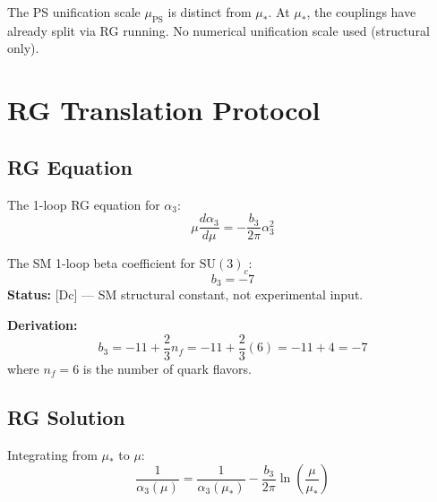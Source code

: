\documentclass[11pt,a4paper]{article}
\theoremstyle{definition}
\begin{document}
\begin{trapbox}
The PS unification scale $\mu_{\text{PS}}$ is distinct from $\mu_*$.
At $\mu_*$, the couplings have already split via RG running.
No numerical unification scale used (structural only).
\end{trapbox}

\newpage

\section{RG Translation Protocol}
\label{sec:rg-translation}

\subsection{RG Equation}
\label{subsec:rg-equation}

The 1-loop RG equation for $\alpha_3$:
\begin{equation}
  \label{eq:rg-alpha3}
  \mu \frac{d\alpha_3}{d\mu} = -\frac{b_3}{2\pi} \alpha_3^2
\end{equation}

\begin{canonbox}
The SM 1-loop beta coefficient for $\text{SU}(3)_c$:
\begin{equation}
  \label{eq:b3-value}
  b_3 = -7
\end{equation}
\textbf{Status:} [Dc] — SM structural constant, not experimental input.

\textbf{Derivation:}
\begin{equation}
  \label{eq:b3-derivation}
  b_3 = -11 + \frac{2}{3}n_f = -11 + \frac{2}{3}(6) = -11 + 4 = -7
\end{equation}
where $n_f = 6$ is the number of quark flavors.
\end{canonbox}

\subsection{RG Solution}
\label{subsec:rg-solution}

Integrating from $\mu_*$ to $\mu$:
\begin{equation}
  \label{eq:rg-solution}
  \frac{1}{\alpha_3(\mu)} = \frac{1}{\alpha_3(\mu_*)} - \frac{b_3}{2\pi} \ln\left(\frac{\mu}{\mu_*}\right)
\end{equation}
\end{document}
